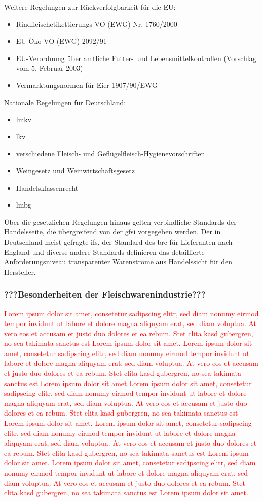 \noindent
Weitere Regelungen zur Rückverfolgbarkeit für die EU:
\begin{itemize}
  \item Rindfleischetikettierungs-VO (EWG) Nr. 1760/2000
  \item EU-Öko-VO (EWG) 2092/91
  \item EU-Verordnung über amtliche Futter- und Lebensmittelkontrollen (Vorschlag vom 5. Februar 2003)
  \item Vermarktungsnormen für Eier 1907/90/EWG
\end{itemize}
Nationale Regelungen für Deutschland:
\begin{itemize}
  \item \acf{lmkv}
  \item \acf{lkv}
  \item verschiedene Fleisch- und Geflügelfleisch-Hygienevorschriften
  \item Weingesetz und Weinwirtschaftsgesetz
  \item Handelsklassenrecht
  \item \acf{lmbg}
\end{itemize}
Über die gesetzlichen Regelungen hinaus gelten verbindliche Standards der Handelsseite, die übergreifend von der \ac{gfsi} vorgegeben werden. Der in Deutschland meist gefragte \ac{ifs}, der Standard des \ac{brc} für Lieferanten nach England und diverse andere Standards definieren das detaillierte Anforderungsniveau transparenter Warenströme aus Handelssicht für den Hersteller.

\subsubsection{???Besonderheiten der Fleischwarenindustrie???}
\textcolor{red}{Lorem ipsum dolor sit amet, consetetur sadipscing elitr, sed diam nonumy eirmod tempor invidunt ut labore et dolore magna aliquyam erat, sed diam voluptua. At vero eos et accusam et justo duo dolores et ea rebum. Stet clita kasd gubergren, no sea takimata sanctus est Lorem ipsum dolor sit amet. Lorem ipsum dolor sit amet, consetetur sadipscing elitr, sed diam nonumy eirmod tempor invidunt ut labore et dolore magna aliquyam erat, sed diam voluptua. At vero eos et accusam et justo duo dolores et ea rebum. Stet clita kasd gubergren, no sea takimata sanctus est Lorem ipsum dolor sit amet.Lorem ipsum dolor sit amet, consetetur sadipscing elitr, sed diam nonumy eirmod tempor invidunt ut labore et dolore magna aliquyam erat, sed diam voluptua. At vero eos et accusam et justo duo dolores et ea rebum. Stet clita kasd gubergren, no sea takimata sanctus est Lorem ipsum dolor sit amet. Lorem ipsum dolor sit amet, consetetur sadipscing elitr, sed diam nonumy eirmod tempor invidunt ut labore et dolore magna aliquyam erat, sed diam voluptua. At vero eos et accusam et justo duo dolores et ea rebum. Stet clita kasd gubergren, no sea takimata sanctus est Lorem ipsum dolor sit amet. Lorem ipsum dolor sit amet, consetetur sadipscing elitr, sed diam nonumy eirmod tempor invidunt ut labore et dolore magna aliquyam erat, sed diam voluptua. At vero eos et accusam et justo duo dolores et ea rebum. Stet clita kasd gubergren, no sea takimata sanctus est Lorem ipsum dolor sit amet.}
